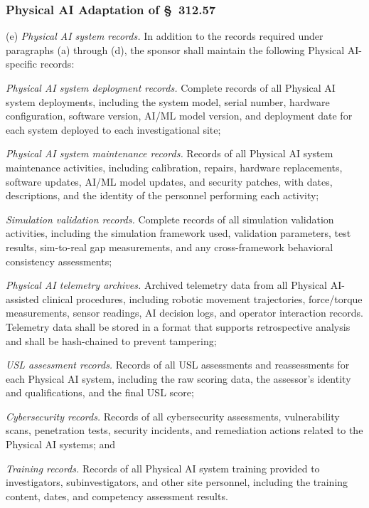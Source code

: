 \documentclass[11pt]{article}
\begin{document}
\subsubsection{Physical AI Adaptation of \S~312.57}

(e) \textit{Physical AI system records.} In addition to the records required under paragraphs (a) through (d), the sponsor shall maintain the following Physical AI-specific records:

\begin{description}[leftmargin=0.8cm,style=sameline]
\item[(i)] \textit{Physical AI system deployment records.} Complete records of all Physical AI system deployments, including the system model, serial number, hardware configuration, software version, AI/ML model version, and deployment date for each system deployed to each investigational site;
\item[(ii)] \textit{Physical AI system maintenance records.} Records of all Physical AI system maintenance activities, including calibration, repairs, hardware replacements, software updates, AI/ML model updates, and security patches, with dates, descriptions, and the identity of the personnel performing each activity;
\item[(iii)] \textit{Simulation validation records.} Complete records of all simulation validation activities, including the simulation framework used, validation parameters, test results, sim-to-real gap measurements, and any cross-framework behavioral consistency assessments;
\item[(iv)] \textit{Physical AI telemetry archives.} Archived telemetry data from all Physical AI-assisted clinical procedures, including robotic movement trajectories, force/torque measurements, sensor readings, AI decision logs, and operator interaction records. Telemetry data shall be stored in a format that supports retrospective analysis and shall be hash-chained to prevent tampering;
\item[(v)] \textit{USL assessment records.} Records of all USL assessments and reassessments for each Physical AI system, including the raw scoring data, the assessor's identity and qualifications, and the final USL score;
\item[(vi)] \textit{Cybersecurity records.} Records of all cybersecurity assessments, vulnerability scans, penetration tests, security incidents, and remediation actions related to the Physical AI systems; and
\item[(vii)] \textit{Training records.} Records of all Physical AI system training provided to investigators, subinvestigators, and other site personnel, including the training content, dates, and competency assessment results.
\end{description}
\end{document}
